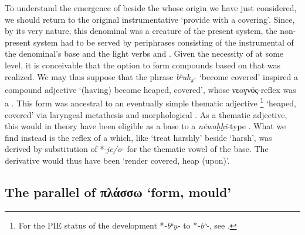 \documentclass[output=paper,colorlinks,citecolor=brown]{langscibook}
\begin{document}
To understand the emergence of  beside the  whose origin we have just considered, we should return to the original instrumentative  ‘provide with a covering’. Since, by its very nature, this denominal  was a creature of the present system, the non-present system had to be served by periphrases consisting of the instrumental of the denominal’s base and the light verbs  and . Given the necessity of  at some level, it is conceivable that the option to form compounds based on that  was realized. We may thus suppose that the  phrase  \textit{bʰuh\textsubscript{x}}-  ‘become covered’ inspired a  compound adjective  ‘(having) become heaped, covered’, whose νεoγνός-reflex was a . This form was ancestral to an eventually simple thematic adjective \footnote{For the PIE status of the development *\textit{-bʰ}\textit{u̯-} to *\textit{-bʰ}\textit{-}, see \citealt[312--313]{Merritt2021}.} ‘heaped, covered’ via laryngeal metathesis and morphological . As a thematic adjective, this  would in theory have been eligible as a base to a \textit{nēwaḫḫi}-type . What we find instead is the reflex of a  which, like  ‘treat harshly’ beside  ‘harsh’, was derived by substitution of *-\textit{i̯e/o}- for the thematic vowel of the  base. The derivative would thus have been  ‘render covered, heap (upon)’.

\subsection{The parallel of πλάσσω ‘form, mould’}
\end{document}
